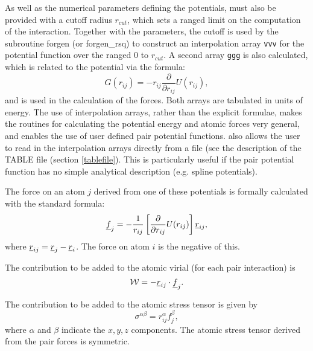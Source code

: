 As well as the numerical parameters defining the potentials,
\D{} must also be provided with a cutoff radius $r_{cut}$,
which sets a ranged limit on the computation of the interaction.
Together with the parameters, the cutoff is used by the subroutine
{\sc forgen} (or {\sc forgen\_rsq}) to construct an interpolation
array {\tt vvv} for the potential function over the ranged 0 to
$r_{cut}$. A second array {\tt ggg} is also calculated, which is
related to the potential via the formula:
\begin{equation}
G(r_{ij})=-r_{ij}\frac{\partial}{\partial r_{ij}}U(r_{ij}),
\end{equation}
and is used in the calculation of the forces. Both arrays are
tabulated in units of energy.  The use of interpolation arrays, rather
than the explicit formulae, makes the routines for calculating the
potential energy and atomic forces very general, and
enables the use of user defined pair potential functions.
\D{} also allows the user to read in the interpolation arrays
directly from a file (see the description of the TABLE file (section
\ref{tablefile}).  This is particularly useful if the pair potential
function has no simple analytical description (e.g.  spline
potentials).

The force on an atom $j$ derived from one of these potentials is
formally calculated with the standard formula:
\begin{equation}
\mbox{$\underline{f}$}_{j}=-\frac{1}{r_{ij}}\left[\frac{\partial}{\partial 
r_{ij}}U(r_{ij})\right]\mbox{$\underline{r}$}_{ij},
\end{equation}
where $\mbox{$\underline{r}$}_{ij}=\mbox{$\underline{r}$}_{j}-\mbox{$\underline{r}$}_{i}$. The force on atom $i$ is
the negative of this.

The contribution to be added to the atomic virial (for each pair
interaction) is
\begin{equation}
{\cal W}=-\mbox{$\underline{r}$}_{ij}\cdot\mbox{$\underline{f}$}_{j}.
\end{equation}

The contribution to be added to the atomic stress tensor is
given by
\begin{equation}
\sigma^{\alpha \beta}=r_{ij}^{\alpha}f_{j}^{\beta},
\end{equation}
where $\alpha$ and $\beta$ indicate the $x,y,z$ components. The atomic
stress tensor derived from the pair forces is symmetric.

